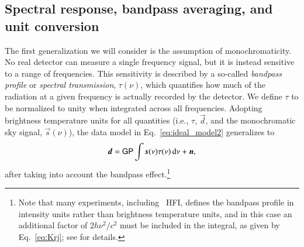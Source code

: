 \documentclass[twocolumn]{aa}
\renewcommand{\d}[0]{\vec{d}}
\newcommand{\n}[0]{\vec{n}}
\newcommand{\s}[0]{\vec{s}}
\renewcommand{\P}[0]{\tens{P}}
\renewcommand{\G}[0]{\tens{G}}
\begin{document}
\subsection{Spectral response, bandpass averaging, and unit conversion}
\label{sec:bandpass}

The first generalization we will consider is the assumption of
monochromaticity. No real detector can measure a single frequency
signal, but it is instead sensitive to a range of frequencies. This
sensitivity is described by a so-called \emph{bandpass profile} or
\emph{spectral transmission}, $\tau(\nu)$, which quantifies how much
of the radiation at a given frequency is actually recorded by the
detector. We define $\tau$ to be normalized to unity when integrated across
all frequencies. Adopting brightness temperature units for all
quantities (i.e., $\tau$, $\d$, and the monochromatic sky signal,
$\s(\nu)$), the data model in Eq.~\eqref{eq:ideal_model2} generalizes to
\begin{equation}
  \d = \G \P\int \s(\nu)\tau(\nu)\,\mathrm d\nu + \n,
  \label{eq:bp}
\end{equation}
after taking into account the bandpass effect.\footnote{Note that many
  experiments, including \Planck\ HFI, defines the bandpass profile in
  intensity units rather than brightness temperature units, and in
  this case an additional factor of $2h\nu^2/c^2$ must be included in
  the integral, as given by Eq.~\eqref{eq:Krj}; see
  \citet{planck2013-p03d} for details.}
\end{document}

